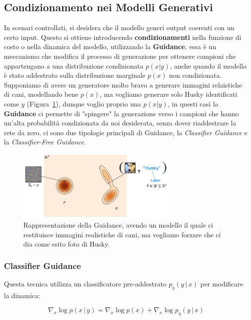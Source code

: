 \subsection{Condizionamento nei Modelli Generativi}
In scenari controllati, si desidera che il modello generi output coerenti con un certo input. Questo si ottiene introducendo \textbf{condizionamenti} nella funzione di costo o nella dinamica del modello, utilizzando la \textbf{Guidance}, essa è un meccanismo che modifica il processo di generazione per ottenere campioni che appartengano a una distribuzione condizionata $p(x|y)$, anche quando il modello è stato addestrato sulla distribuzione marginale $p(x)$ non condizionata. Supponiamo di avere un generatore molto bravo a generare immagini relaistiche di cani, modellando bene  $p(x)$, ma vogliamo generare solo Husky identificati come $y$ (Figura~\ref{fig:Guidance}), dunque voglio proprio una $p(x|y)$, in questi casi la \textbf{Guidance} ci permette di "spingere" la generazione verso i campioni che hanno un'alta probabilità condizionata da noi desiderata, senza dover riaddestrare la rete da zero, ci sono due tipologie principali di Guidance, la \textit{Classifier Guidance} e la \textit{Classifier-Free Guidance}.

\begin{figure}
    \centering
    \includegraphics[width=0.7\textwidth]{figure/Guidance}
    \caption{Rappresentazione della Guidance, avendo un modello il quale ci restituisce immagini realistiche di cani, ma vogliamo forzare che ci dia come esito foto di Husky.}
    \label{fig:Guidance}
\end{figure}

\subsubsection{Classifier Guidance}
Questa tecnica utilizza un classificatore pre-addestrato $p_\eta(y\,|\,x)$ per modificare la dinamica:

\begin{equation}
    \nabla_x\log p(x\,|\,y) = \nabla_x\log p(x) + \nabla_x \log p_\eta (y\,|\,x)
\end{equation}

